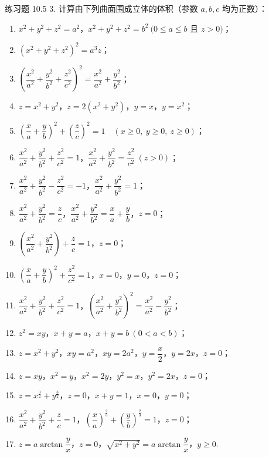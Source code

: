 \begin{exblock}{练习题 10.5}
3. 计算由下列曲面围成立体的体积（参数 $a, b, c$ 均为正数）：
\begin{enumerate}
  \item $x^2 + y^2 + z^2 = a^2$，$x^2 + y^2 + z^2 = b^2\ (0 \leqslant a \leqslant b$ 且 $z > 0)$；
  \item $(x^2 + y^2 + z^2)^2 = a^3 z$；
  \item $\left( \dfrac{x^2}{a^2} + \dfrac{y^2}{b^2} + \dfrac{z^2}{c^2} \right)^2 = \dfrac{x^2}{a^2} + \dfrac{y^2}{b^2}$；
  \item $z = x^2 + y^2$，$z = 2(x^2 + y^2)$，$y = x$，$y = x^2$；
  \item $\left( \dfrac{x}{a} + \dfrac{y}{b} \right)^2 + \left( \dfrac{z}{c} \right)^2 = 1 \quad (x \geqslant 0,\ y \geqslant 0,\ z \geqslant 0)$；
  \item $\dfrac{x^2}{a^2} + \dfrac{y^2}{b^2} + \dfrac{z^2}{c^2} = 1$，$\dfrac{x^2}{a^2} + \dfrac{y^2}{b^2} = \dfrac{z^2}{c^2}\ (z > 0)$；
  \item $\dfrac{x^2}{a^2} + \dfrac{y^2}{b^2} - \dfrac{z^2}{c^2} = -1$，$\dfrac{x^2}{a^2} + \dfrac{y^2}{b^2} = 1$；
  \item $\dfrac{x^2}{a^2} + \dfrac{y^2}{b^2} = \dfrac{z}{c}$，$\dfrac{x^2}{a^2} + \dfrac{y^2}{b^2} = \dfrac{x}{a} + \dfrac{y}{b}$，$z = 0$；
  \item $\left( \dfrac{x^2}{a^2} + \dfrac{y^2}{b^2} \right) + \dfrac{z}{c} = 1$，$z = 0$；
  \item $\left( \dfrac{x}{a} + \dfrac{y}{b} \right)^2 + \dfrac{z^2}{c^2} = 1$，$x = 0$，$y = 0$，$z = 0$；
  \item $\dfrac{x^2}{a^2} + \dfrac{y^2}{b^2} + \dfrac{z^2}{c^2} = 1$，$\left( \dfrac{x^2}{a^2} + \dfrac{y^2}{b^2} \right)^2 = \dfrac{x^2}{a^2} - \dfrac{y^2}{b^2}$；
  \item $z^2 = xy$，$x + y = a$，$x + y = b\ (0 < a < b)$；
  \item $z = x^2 + y^2$，$xy = a^2$，$xy = 2a^2$，$y = \dfrac{x}{2}$，$y = 2x$，$z = 0$；
  \item $z = xy$，$x^2 = y$，$x^2 = 2y$，$y^2 = x$，$y^2 = 2x$，$z = 0$；
  \item $z = x^{\frac{3}{2}} + y^{\frac{3}{2}}$，$z = 0$，$x + y = 1$，$x = 0$，$y = 0$；
  \item $\dfrac{x^2}{a^2} + \dfrac{y^2}{b^2} + \dfrac{z}{c} = 1$，$\left( \dfrac{x}{a} \right)^{\frac{2}{3}} + \left( \dfrac{y}{b} \right)^{\frac{2}{3}} = 1$，$z = 0$；
  \item $z = a \arctan \dfrac{y}{x}$，$z = 0$，$\sqrt{x^2 + y^2} = a \arctan \dfrac{y}{x}$，$y \geqslant 0$.
\end{enumerate}


\end{exblock}
